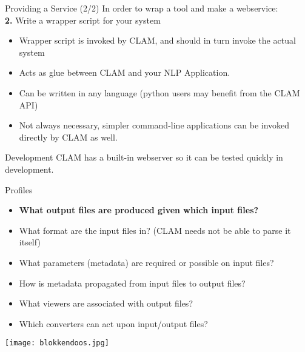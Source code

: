 \documentclass[xcolor=table,10pt,t]{beamer}
\begin{document}
\begin{frame}
    \begin{block}{Providing a Service (2/2)}
        In order to wrap a tool and make a webservice: \\
        \textbf{2.} Write a wrapper script for your system
        \begin{itemize}
            \item Wrapper script is invoked by CLAM, and should in turn invoke the actual system
            \item Acts as glue between CLAM and your NLP Application.
            \item Can be written in any language (python users may benefit from the CLAM API)
            \item Not always necessary, simpler command-line applications can be invoked directly by CLAM as well.
        \end{itemize}
    \end{block}

    \begin{block}{Development}
        CLAM has a built-in webserver so it can be tested quickly in
        development.
    \end{block}

\end{frame}

\begin{frame}
    \begin{block}{Profiles}
        \begin{itemize}
            \item \textbf{What output files are produced given which input files?}
            \item What format are the input files in? (CLAM needs not be able to parse it itself)
            \item What parameters (metadata) are required or possible on input files?
            \item How is metadata propagated from input files to output files?
            \item What viewers are associated with output files?
            \item Which converters can act upon input/output files?
        \end{itemize}
    \end{block}
    \texttt{[image: blokkendoos.jpg]}
\end{frame}
\end{document}
